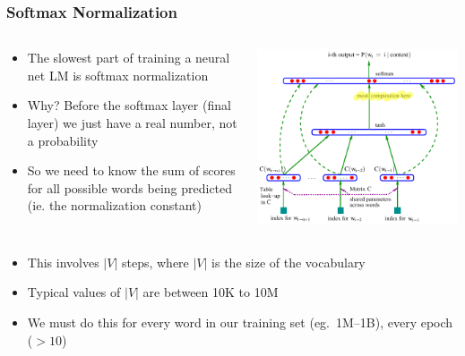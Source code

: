 \documentclass[xcolor=pdftex,x11names,table,hyperref]{beamer}
\begin{document}
\begin{frame}\frametitle{Softmax Normalization}

\begin{minipage}[0.8\textheight]{\textwidth}
\begin{columns}[T]
\begin{column}{0.6\textwidth}
\begin{itemize}
	\item The slowest part of training a neural net LM is softmax normalization
	\item Why?  Before the softmax layer (final layer) we just have a real number, not a probability
	\item So we need to know the sum of scores for all possible words being predicted (ie. the normalization constant)
\end{itemize}
\end{column}
\begin{column}{0.6\textwidth}
\includegraphics[width=1.0\textwidth]{images/bengio-etal2003_pg6_image_alt2.pdf}
\end{column}
\end{columns}
\end{minipage}

\pause

\hspace*{-2.0em}%
\begin{minipage}{1.0\textwidth}
\begin{itemize}
	\item This involves $|V|$ steps, where $|V|$ is the size of the vocabulary
	\item Typical values of $|V|$ are between 10K to 10M
	\item We must do this for every word in our training set (eg.\ 1M--1B), every epoch ($>10$)
\end{itemize}
\end{minipage}

\end{frame}
\end{document}
